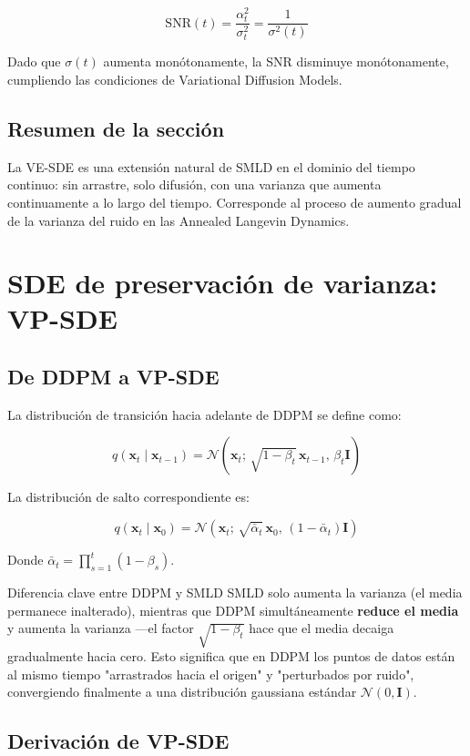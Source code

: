 \documentclass[a4paper]{article}
\begin{document}
$$
\mathrm{SNR}(t) = \frac{\alpha_t^2}{\sigma_t^2} = \frac{1}{\sigma^2(t)}
$$

Dado que $\sigma(t)$ aumenta monótonamente, la SNR disminuye monótonamente, cumpliendo las condiciones de Variational Diffusion Models.

\subsection{Resumen de la sección}

La VE-SDE es una extensión natural de SMLD en el dominio del tiempo continuo: sin arrastre, solo difusión, con una varianza que aumenta continuamente a lo largo del tiempo. Corresponde al proceso de aumento gradual de la varianza del ruido en las Annealed Langevin Dynamics.
\section{SDE de preservación de varianza: VP-SDE}

\subsection{De DDPM a VP-SDE}

La distribución de transición hacia adelante de DDPM se define como:

$$
q(\mathbf{x}_t \mid \mathbf{x}_{t-1}) = \mathcal{N}\!\left(\mathbf{x}_t;\, \sqrt{1-\beta_t}\,\mathbf{x}_{t-1},\, \beta_t \mathbf{I}\right)
$$

La distribución de salto correspondiente es:

$$
q(\mathbf{x}_t \mid \mathbf{x}_0) = \mathcal{N}\!\left(\mathbf{x}_t;\, \sqrt{\bar{\alpha}_t}\,\mathbf{x}_0,\, (1 - \bar{\alpha}_t)\mathbf{I}\right)
$$

Donde $\bar{\alpha}_t = \prod_{s=1}^{t}(1-\beta_s)$.

\begin{warningbox}{Diferencia clave entre DDPM y SMLD}
SMLD solo aumenta la varianza (el media permanece inalterado), mientras que DDPM simultáneamente \textbf{reduce el media} y aumenta la varianza —el factor $\sqrt{1-\beta_t}$ hace que el media decaiga gradualmente hacia cero. Esto significa que en DDPM los puntos de datos están al mismo tiempo "arrastrados hacia el origen" y "perturbados por ruido", convergiendo finalmente a una distribución gaussiana estándar $\mathcal{N}(0, \mathbf{I})$.
\end{warningbox}

\subsection{Derivación de VP-SDE}
\end{document}
